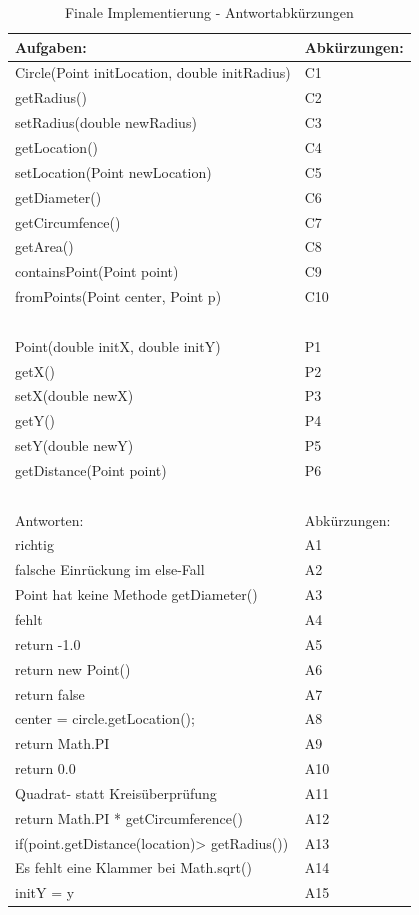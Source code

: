 \begin{table}[h]
    \centering
    \begin{tabular}{|l|l|}
    \hline
        Aufgaben: & Abkürzungen: \\ \hline
        Circle(Point initLocation, double initRadius) & C1 \\ \hline
        getRadius() & C2 \\ \hline
        setRadius(double newRadius) & C3 \\ \hline
        getLocation() & C4 \\ \hline
        setLocation(Point newLocation) & C5 \\ \hline
        getDiameter() & C6 \\ \hline
        getCircumfence() & C7 \\ \hline
        getArea() & C8 \\ \hline
        containsPoint(Point point) & C9 \\ \hline
        fromPoints(Point center, Point p) & C10 \\ \hline
        ~ & ~ \\ \hline
        Point(double initX, double initY) & P1 \\ \hline
        getX() & P2 \\ \hline
        setX(double newX) & P3 \\ \hline
        getY() & P4 \\ \hline
        setY(double newY) & P5 \\ \hline
        getDistance(Point point) & P6 \\ \hline
        ~ & ~ \\ \hline
        Antworten: & Abkürzungen: \\ \hline
        richtig & A1 \\ \hline
        falsche Einrückung im else-Fall & A2 \\ \hline
        Point hat keine Methode getDiameter() & A3 \\ \hline
        fehlt & A4 \\ \hline
        return -1.0 & A5 \\ \hline
        return new Point() & A6 \\ \hline
        return false & A7 \\ \hline
        center = circle.getLocation(); & A8 \\ \hline
        return Math.PI & A9 \\ \hline
        return 0.0 & A10 \\ \hline
        Quadrat- statt Kreisüberprüfung & A11 \\ \hline
        return Math.PI * getCircumference() & A12 \\ \hline
        if(point.getDistance(location)> getRadius()) & A13 \\ \hline
        Es fehlt eine Klammer bei Math.sqrt() & A14 \\ \hline
        initY = y & A15 \\ \hline
    \end{tabular}
	\caption{Finale Implementierung - Antwortabkürzungen}
\label{tab:Abk}
\end{table}